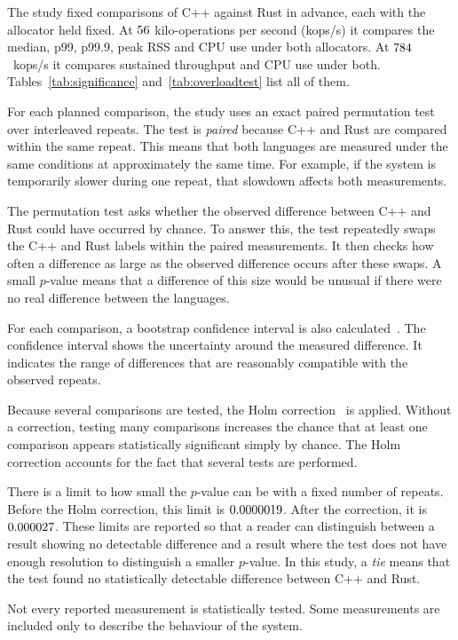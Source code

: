 \documentclass[english,oneside,a4paper,censored,csm,software-track-2020]{HYthesisML}
\begin{document}
The study fixed \NTests{} comparisons of C++ against Rust in advance, each with the
allocator held fixed. At $56$ kilo-operations per second (kops/s) it compares the median, p99,
p99.9, peak RSS and CPU use under both allocators. At $784$~kops/s it compares
sustained throughput and CPU use under both. Tables~\ref{tab:significance}
and~\ref{tab:overloadtest} list all of them.

For each planned comparison, the study uses an exact paired permutation test over \NRepeats{}
interleaved repeats. The test is \emph{paired} because C++ and Rust are compared
within the same repeat. This means that both languages are measured under the same
conditions at approximately the same time. For example, if the system is temporarily
slower during one repeat, that slowdown affects both measurements.

The permutation test asks whether the observed difference between C++ and Rust could
have occurred by chance. To answer this, the test repeatedly swaps the C++ and Rust
labels within the paired measurements. It then checks how often a difference as large
as the observed difference occurs after these swaps. A small $p$-value means that a
difference of this size would be unusual if there were no real difference between
the languages.

For each comparison, a bootstrap confidence interval is also
calculated~\cite{efron1993bootstrap}. The confidence interval shows the uncertainty
around the measured difference. It indicates the range of differences that are
reasonably compatible with the observed repeats.

Because several comparisons are tested, the Holm
correction~\cite{holm1979simple} is applied. Without a correction, testing many comparisons
increases the chance that at least one comparison appears statistically significant
simply by chance. The Holm correction accounts for the fact that several tests are
performed.

There is a limit to how small the $p$-value can be with a fixed number of repeats.
Before the Holm correction, this limit is $0.0000019$. After the correction,
it is $0.000027$. These limits are reported so that a reader can distinguish
between a result showing no detectable difference and a result where the test does
not have enough resolution to distinguish a smaller $p$-value. In this study, a
\emph{tie} means that the test found no statistically detectable difference between
C++ and Rust.

Not every reported measurement is statistically tested. Some measurements are
included only to describe the behaviour of the system.
\end{document}
